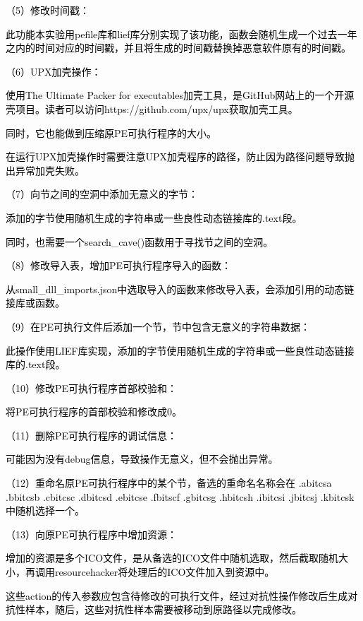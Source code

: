 \textcolor{black}{（5）修改时间戳：}

\textcolor{black}{此功能本实验用pefile库和lief库分别实现了该功能，函数会随机生成一个过去一年之内的时间对应的时间戳，并且将生成的时间戳替换掉恶意软件原有的时间戳。}

\textcolor{black}{（6）UPX加壳操作：}

\textcolor{black}{使用The Ultimate Packer for executables加壳工具，是GitHub网站上的一个开源壳项目。读者可以访问https://github.com/upx/upx获取加壳工具。}

\textcolor{black}{同时，它也能做到压缩原PE可执行程序的大小。}

\textcolor{black}{在运行UPX加壳操作时需要注意UPX加壳程序的路径，防止因为路径问题导致抛出异常加壳失败。}

\textcolor{black}{（7）向节之间的空洞中添加无意义的字节：}

\textcolor{black}{添加的字节使用随机生成的字符串或一些良性动态链接库的.text段。}

\textcolor{black}{同时，也需要一个search\_cave()函数用于寻找节之间的空洞。}

\textcolor{black}{（8）修改导入表，增加PE可执行程序导入的函数：}

\textcolor{black}{从small\_dll\_imports.json中选取导入的函数来修改导入表，会添加引用的动态链接库或函数。}

\textcolor{black}{（9）在PE可执行文件后添加一个节，节中包含无意义的字符串数据：}

\textcolor{black}{此操作使用LIEF库实现，添加的字节使用随机生成的字符串或一些良性动态链接库的.text段。}

\textcolor{black}{（10）修改PE可执行程序首部校验和：}

\textcolor{black}{将PE可执行程序的首部校验和修改成0。}

\textcolor{black}{（11）删除PE可执行程序的调试信息：}

\textcolor{black}{可能因为没有debug信息，导致操作无意义，但不会抛出异常。}

\textcolor{black}{（12）重命名原PE可执行程序中的某个节，备选的重命名名称会在
.abitcsa .bbitcsb .cbitcsc .dbitcsd .ebitcse .fbitscf .gbitcsg .hbitcsh .ibitcsi .jbitcsj .kbitcsk中随机选择一个。
}

\textcolor{black}{（13）向原PE可执行程序中增加资源：}

\textcolor{black}{增加的资源是多个ICO文件，是从备选的ICO文件中随机选取，然后截取随机大小，再调用resourcehacker将处理后的ICO文件加入到资源中。}

\textcolor{black}{这些action的传入参数应包含待修改的可执行文件，经过对抗性操作修改后生成对抗性样本，随后，这些对抗性样本需要被移动到原路径以完成修改。}

